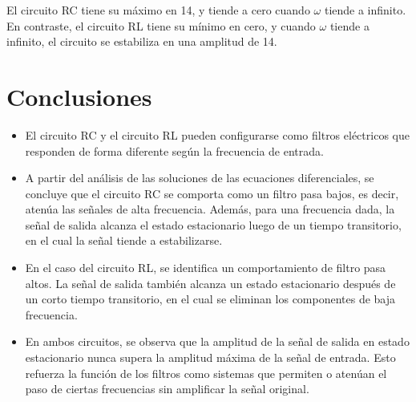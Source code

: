 \documentclass{article}
\begin{document}
El circuito RC tiene su máximo en 14, y tiende a cero cuando $\omega$ tiende a infinito. En contraste, el circuito RL tiene su mínimo en cero, y cuando $\omega$ tiende a infinito, el circuito se estabiliza en una amplitud de 14.
\section{Conclusiones}

\begin{itemize}
    \item El circuito RC y el circuito RL pueden configurarse como filtros eléctricos que responden de forma diferente según la frecuencia de entrada.
    
    \item A partir del análisis de las soluciones de las ecuaciones diferenciales, se concluye que el circuito RC se comporta como un filtro pasa bajos, es decir, atenúa las señales de alta frecuencia. Además, para una frecuencia dada, la señal de salida alcanza el estado estacionario luego de un tiempo transitorio, en el cual la señal tiende a estabilizarse.
    
    \item En el caso del circuito RL, se identifica un comportamiento de filtro pasa altos. La señal de salida también alcanza un estado estacionario después de un corto tiempo transitorio, en el cual se eliminan los componentes de baja frecuencia.
    
    \item En ambos circuitos, se observa que la amplitud de la señal de salida en estado estacionario nunca supera la amplitud máxima de la señal de entrada. Esto refuerza la función de los filtros como sistemas que permiten o atenúan el paso de ciertas frecuencias sin amplificar la señal original.
\end{itemize}

\printbibliography
\end{document}

